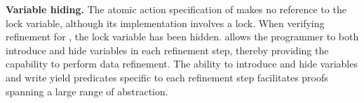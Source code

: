 {\bf Variable hiding.}
The atomic action specification of  makes no reference to the lock variable, although its implementation involves a lock. 
When verifying refinement for , the lock variable has been hidden. 
\civl allows the programmer to both introduce and hide variables in
each refinement step, thereby providing the capability to perform data refinement.
The ability to introduce and hide variables and write yield predicates specific to each refinement step 
facilitates proofs spanning a large range of abstraction.

%

